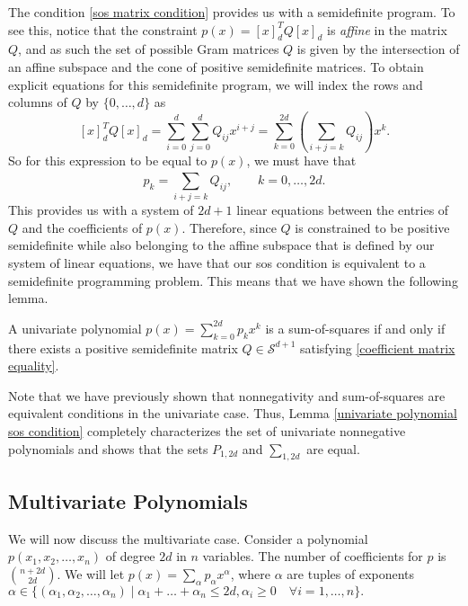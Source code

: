 	The condition \eqref{sos matrix condition} provides us with a semidefinite program. To see this, notice that the constraint $p(x) = [x]_d^T Q [x]_d$ is \emph{affine} in the matrix $Q$, and as such the set of possible Gram matrices $Q$ is given by the intersection of an affine subspace and the cone of positive semidefinite matrices. To obtain explicit equations for this semidefinite program, we will index the rows and columns of $Q$ by $\{0, \dots, d\}$ as 
	$$
	[x]_d^T Q [x]_d = \sum_{i=0}^{d} \sum_{j=0}^{d} Q_{ij} x^{i+j}= \sum_{k = 0}^{2d} \left( \sum_{i+j = k}^{} Q_{ij} \right) x^k.
	$$
	So for this expression to be equal to $p(x)$, we must have that 
	\begin{equation} \label{coefficient matrix equality}
		p_k = \sum_{i + j = k}^{} Q_{ij}, \qquad k = 0, \dots, 2d.
	\end{equation}
	This provides us with a system of $2d+1$ linear equations between the entries of $Q$ and the coefficients of $p(x)$. Therefore, since $Q$ is constrained to be positive semidefinite while also belonging to the affine subspace that is defined by our system of linear equations, we have that our sos condition is equivalent to a semidefinite programming problem. This means that we have shown the following lemma. 
	\begin{lemma} \label{univariate polynomial sos condition}
		A univariate polynomial $p(x) = \sum_{k=0}^{2d} p_k x^k$ is a sum-of-squares if and only if there exists a positive semidefinite matrix $Q \in \mathcal{S}^{d+1}$ satisfying \eqref{coefficient matrix equality}.
	\end{lemma}
	Note that we have previously shown that nonnegativity and sum-of-squares are equivalent conditions in the univariate case. Thus, Lemma \ref{univariate polynomial sos condition} completely characterizes the set of univariate nonnegative polynomials and shows that the sets $P_{1, 2d}$ and $\sum_{1, 2d}$ are equal. 
	
	\subsection{Multivariate Polynomials}
	
	We will now discuss the multivariate case. Consider a polynomial $p(x_1, x_2, \dots, x_n)$ of degree $2d$ in $n$ variables. The number of coefficients for $p$ is $\binom{n+2d}{2d}$. We will let $p(x) = \sum_{\alpha} p_{\alpha} x^{\alpha}$, where $\alpha$ are tuples of exponents $\alpha \in \{ (\alpha_1 , \alpha_2, \dots, \alpha_n) \mid \alpha_1 + \dots + \alpha_n \leq 2d, \alpha_i \geq 0 \quad \forall i = 1, \dots, n \}.$
	
